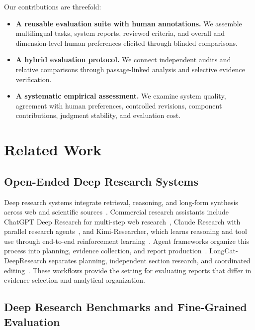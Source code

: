 \documentclass{article}
\begin{document}
Our contributions are threefold:
\begin{itemize}
    \item \textbf{A reusable evaluation suite with human annotations.}
    We assemble multilingual tasks, system reports, reviewed criteria, and overall and dimension-level human preferences elicited through blinded comparisons.

    \item \textbf{A hybrid evaluation protocol.}
    We connect independent audits and relative comparisons through passage-linked analysis and selective evidence verification.

    \item \textbf{A systematic empirical assessment.}
    We examine system quality, agreement with human preferences, controlled revisions, component contributions, judgment stability, and evaluation cost.
\end{itemize}

\section{Related Work}
\label{sec:related_work}


\subsection{Open-Ended Deep Research Systems}

Deep research systems integrate retrieval, reasoning, and long-form synthesis across web and scientific sources~\citep{webthinker2025,openscholar2026}. Commercial research assistants include ChatGPT Deep Research for multi-step web research~\citep{openai_deepresearch2025}, Claude Research with parallel research agents~\citep{claude_research2025}, and Kimi-Researcher, which learns reasoning and tool use through end-to-end reinforcement learning~\citep{kimi_researcher2025}. Agent frameworks organize this process into planning, evidence collection, and report production~\citep{elovic2023gptresearcher}. LongCat-DeepResearch separates planning, independent section research, and coordinated editing~\citep{longcat_deepresearch2026}. These workflows provide the setting for evaluating reports that differ in evidence selection and analytical organization.

\subsection{Deep Research Benchmarks and Fine-Grained Evaluation}
\end{document}

